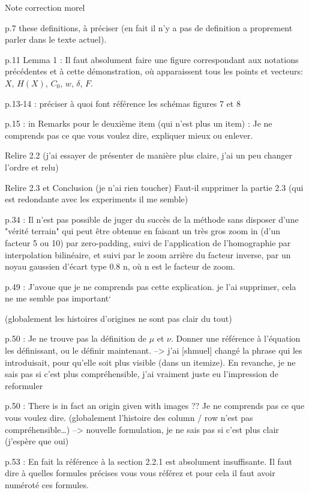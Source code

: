 Note correction morel

p.7 these definitions, à préciser (en fait il n’y a pas de definition a proprement parler dans le texte actuel).

p.11 Lemma 1 :  Il faut absolument faire une figure correspondant aux notations précédentes et à cette démonstration, où apparaissent tous  les points et vecteurs: $X$, $H(X)$, $C_0$, $w$, $\delta$, $F$.

p.13-14 : préciser à quoi font référence les schémas figures 7 et 8

p.15 : in Remarks pour le deuxième item (qui n’est plus un item) :  Je ne comprends pas ce que vous voulez dire, expliquer mieux ou enlever.

Relire 2.2 (j’ai essayer de présenter de manière plus claire, j’ai un peu changer l’ordre et relu)

Relire 2.3 et Conclusion (je n’ai rien toucher) 
Faut-il supprimer la partie 2.3 (qui est redondante avec les experiments il me semble)

p.34 : Il n'est pas possible de juger du succès de la méthode sans disposer d'une "vérité terrain" qui peut être obtenue en faisant un très gros zoom in (d'un facteur 5 ou 10) par zero-padding, suivi de l'application de l'homographie par interpolation bilinéaire, et suivi par le zoom arrière du facteur inverse, par un noyau gaussien d'écart type 0.8 n, où n est  le facteur de zoom.

p.49 : J'avoue que je ne comprends pas cette explication. 
je l’ai supprimer, cela ne me semble pas important`

(globalement les histoires d’origines ne sont pas clair du tout)

p.50 : Je ne trouve pas la définition de $\mu$ et $\nu$. Donner une référence à l'équation les définissant, ou le définir maintenant.
--> j'ai [shmuel] changé la phrase qui les introduisait, pour qu'elle soit plus visible (dans un itemize). En revanche, je ne sais pas si c'est plus compréhensible, j'ai vraiment juste eu l'impression de reformuler

p.50 : There is in fact an origin given with images ?? Je ne comprends pas ce que vous voulez dire.
(globalement l’histoire des column / row n’est pas compréhensible…)
--> nouvelle formulation, je ne sais pas si c'est plus clair (j'espère que oui)

p.53 : En fait la référence à la section 2.2.1 est absolument insuffisante. Il faut dire à quelles formules précises vous vous référez et pour cela il faut avoir numéroté ces formules.

